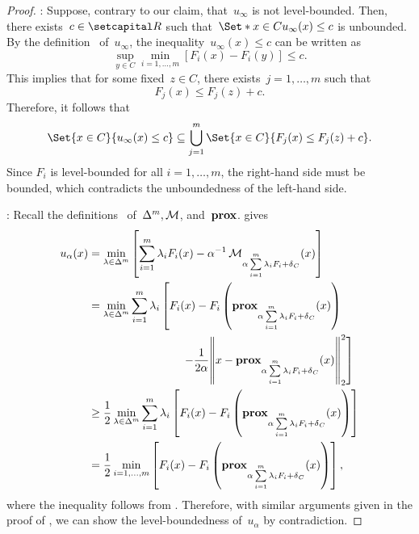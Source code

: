 \documentclass[../main]{subfiles}
\begin{document}
\begin{proof}
    : Suppose, contrary to our claim, that~$u_\infty$ is not level-bounded.
    Then, there exists~$c \in \setR$ such that~$\Set*{ x \in C }{ u_\infty(x) \le c }$ is unbounded.
    By the definition~ of~$u_\infty$, the inequality~$u_\infty(x) \le c$ can be written as
    \begin{equation}
        \sup_{y \in C} \min_{i = 1, \dots, m} [ F_i(x) - F_i(y) ] \le c.
    \end{equation}
    This implies that for some fixed~$z \in C$, there exists~$j = 1, \dots, m$ such that
    \begin{equation}
        F_j(x) \le F_j(z) + c.
    \end{equation}
    Therefore, it follows that
    \begin{equation}
        \Set{ x \in C}{ u_\infty(x) \le c } \subseteq \bigcup_{j = 1}^m \Set{ x \in C }{ F_j(x) \le F_j(z) + c }.
    \end{equation}
    Since $F_i$ is level-bounded for all $i = 1, \dots, m$, the right-hand side must be bounded, which contradicts the unboundedness of the left-hand side.

    : Recall the definitions~ of~$\Delta^m,\operatorname{\mathcal{M}}$, and~$\operatorname{\mathbf{prox}}$.
     gives
    \begin{equation}
        \begin{aligned}
            u_\alpha(x) &= \min_{\lambda \in \Delta^m} \left[ \sum_{i = 1}^{m} \lambda_i F_i(x) - \alpha^{-1} \envelope_{\alpha \sum\limits_{i = 1}^{m} \lambda_i F_i + \indicator_C}(x) \right] \\
                      &\begin{multlined}
                          = \min_{\lambda \in \Delta^m} \sum_{i = 1}^{m} \lambda_i \left[ F_i(x) - F_i\left( \prox_{\alpha \sum\limits_{i = 1}^{m} \lambda_i F_i + \indicator_C}(x) \right) \right. \\
                          \left.- \frac{1}{2 \alpha} \norm*{x - \prox_{\alpha \sum\limits_{i = 1}^{m} \lambda_i F_i + \indicator_C}(x)}_2^2 \right] 
                      \end{multlined} \\
                      &\ge \frac{1}{2} \min_{\lambda \in \Delta^m} \sum_{i = 1}^{m} \lambda_i \left[ F_i(x) - F_i\left( \prox_{\alpha \sum\limits_{i = 1}^{m} \lambda_i F_i + \indicator_C}(x) \right) \right] \\
                      &= \frac{1}{2} \min_{i = 1, \dots, m} \left[ F_i(x) - F_i\left( \prox_{\alpha \sum\limits_{i = 1}^{m} \lambda_i F_i + \indicator_C}(x) \right) \right] 
        ,\end{aligned}
    \end{equation} 
    where the inequality follows from .
    Therefore, with similar arguments given in the proof of , we can show the level-boundedness of~$u_\alpha$ by contradiction.


\end{proof}
\end{document}
